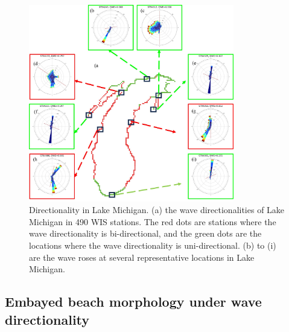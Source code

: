 \begin{figure}[htbp]
  \centering
  \includegraphics[width=0.8\textwidth]{chapter3/resources/figure3-11.jpg}
  \caption{Directionality in Lake Michigan. (a) the wave directionalities of Lake Michigan in 490 WIS stations. The red dots are stations where the wave directionality is bi-directional, and the green dots are the locations where the wave directionality is uni-directional. (b) to (i) are the wave roses at several representative locations in Lake Michigan.}
  \label{fig:fig3.11}
\end{figure}

\subsection{Embayed beach morphology under wave directionality}
\label{Embayed beach morphology under wave directionality}

